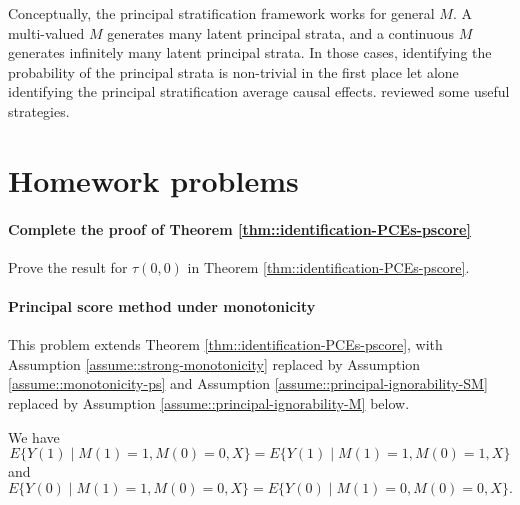  
Conceptually, the principal stratification framework works for general $M$. A multi-valued $M$ generates many latent principal strata, and a continuous $M$ generates infinitely many latent principal strata. In those cases, identifying the probability of the principal strata is non-trivial in the first place let alone identifying the principal stratification average causal effects.  \citet{jiang2020identification} reviewed some useful strategies. 
 


\section{Homework problems}


\paragraph{Complete the proof of Theorem \ref{thm::identification-PCEs-pscore}}\label{hw::proof-part2-identification-PCEs}

Prove the result for $\tau(0,0) $ in Theorem \ref{thm::identification-PCEs-pscore}. 


 
\paragraph{Principal score method under monotonicity}\label{para::prinpscore-mono}



This problem extends Theorem \ref{thm::identification-PCEs-pscore}, with Assumption \ref{assume::strong-monotonicity} replaced by Assumption \ref{assume::monotonicity-ps} and Assumption \ref{assume::principal-ignorability-SM} replaced by Assumption \ref{assume::principal-ignorability-M} below. 

\begin{assumption}
\label{assume::principal-ignorability-M}
We have 
$$
E\{  Y(1) \mid M(1) = 1, M(0) =0, X \} = E\{  Y(1) \mid M(1) = 1, M(0) =1, X \}
$$
and
$$
E\{  Y(0) \mid M(1) = 1, M(0) =0, X \} = E\{  Y(0) \mid M(1) = 0, M(0) =0, X \}. 
$$
\end{assumption}


